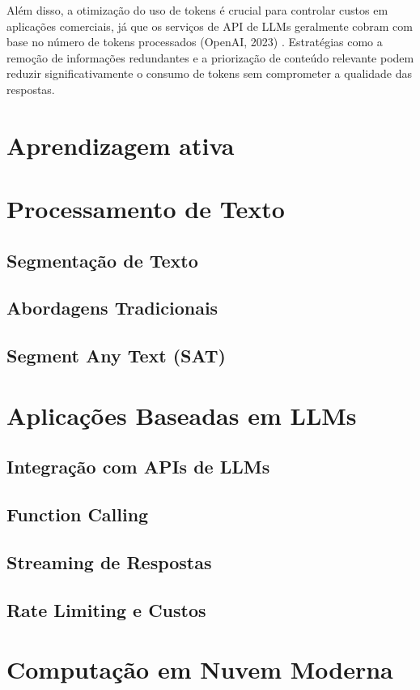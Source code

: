 \documentclass[tcc,capa]{texufpel}
\begin{document}
Além disso, a otimização do uso de tokens é crucial para controlar custos em aplicações comerciais, já que os serviços de API de LLMs geralmente cobram com base no número de tokens processados (OpenAI, 2023) \cite{openai2023pricing}. Estratégias como a remoção de informações redundantes e a priorização de conteúdo relevante podem reduzir significativamente o consumo de tokens sem comprometer a qualidade das respostas.


\section{Aprendizagem ativa}

\section{Processamento de Texto}
\subsection{Segmentação de Texto}
\subsection{Abordagens Tradicionais}
\subsection{Segment Any Text (SAT)}


\section{Aplicações Baseadas em LLMs}
\subsection{Integração com APIs de LLMs}
\subsection{Function Calling}
\subsection{Streaming de Respostas} 
\subsection{Rate Limiting e Custos}

\section{Computação em Nuvem Moderna}
\end{document}
